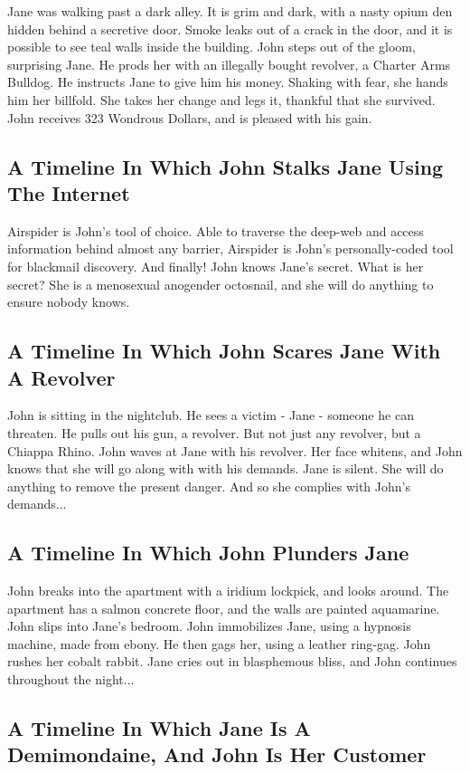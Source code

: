 \documentclass{article}
\begin{document}
Jane was walking past a dark alley.
It is grim and dark, with a nasty opium den hidden behind a secretive door.
Smoke leaks out of a crack in the door, and it is possible to see teal walls inside the building.
John steps out of the gloom, surprising Jane.
He prods her with an illegally bought revolver, a Charter Arms Bulldog.
He instructs Jane to give him his money.
Shaking with fear, she hands him her billfold.
She takes her change and legs it, thankful that she survived.
John receives 323 Wondrous Dollars, and is pleased with his gain.
\subsection{A Timeline In Which John Stalks Jane Using The Internet}


Airspider is John's tool of choice. Able to traverse the deep{-}web and access information behind almost any barrier, Airspider is John's personally{-}coded tool for blackmail discovery.
And finally!
John knows Jane's secret. What is her secret? She is a menosexual anogender octosnail, and she will do anything to ensure nobody knows.
\subsection{A Timeline In Which John Scares Jane With A Revolver}


John is sitting in the nightclub.
He sees a victim {-} Jane {-} someone he can threaten. He pulls out his gun, a revolver.
But not just any revolver, but a Chiappa Rhino.
John waves at Jane with his revolver. Her face whitens, and John knows that she will go along with with his demands.
Jane is silent. She will do anything to remove the present danger. And so she complies with John's demands...
\subsection{A Timeline In Which John Plunders Jane}


John breaks into the apartment with a iridium lockpick, and looks around.
The apartment has a salmon concrete floor, and the walls are painted aquamarine.
John slips into Jane's bedroom.
John immobilizes Jane, using a hypnosis machine, made from ebony.
He then gags her, using a leather ring{-}gag.
John rushes her cobalt rabbit.
Jane cries out in blasphemous bliss, and John continues throughout the night...
\subsection{A Timeline In Which Jane Is A Demimondaine, And John Is Her Customer}
\end{document}
